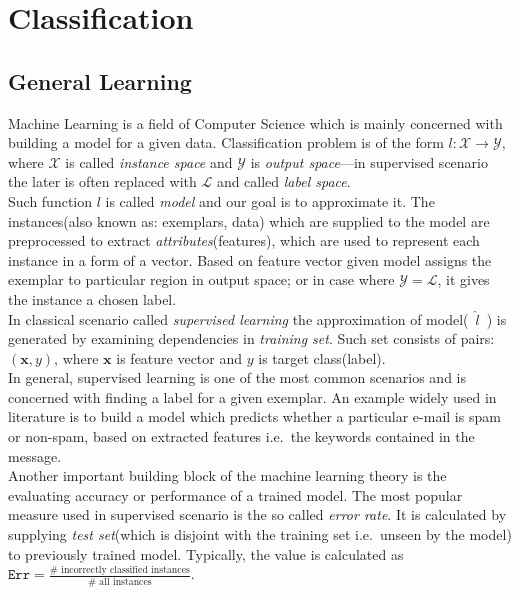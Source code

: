 \documentclass[12pt, a4paper, pdflatex, leqno, twoside]{report}
\begin{document}
\section{Classification}
\subsection{General Learning}
Machine Learning is a field of Computer Science which is mainly concerned with 
building a model for a given data. Classification problem is of the form 
$\mathit{l} : \mathscr{X} \rightarrow \mathscr{Y}$, where $\mathscr{X}$ is 
called \emph{instance space} and $\mathscr{Y}$ is \emph{output space}---in 
supervised scenario the later is often replaced with $\mathscr{L}$ and called \emph{label 
space}.\\
Such function $\mathit{l}$ is called \emph{model} and our goal is to approximate it. 
The instances(also known as: exemplars, data) which are supplied to the model are preprocessed to extract 
\emph{attributes}(features), which are used to represent each instance in a form of a vector. Based on feature vector given model assigns the exemplar to 
particular region in output space; or in case where $\mathscr{Y} = \mathscr{L}$, it 
gives the instance a chosen label.\\

In classical scenario called \emph{supervised learning} the approximation of 
model(~$\mathit{\hat{l}}$~) is generated by examining dependencies in \emph{training set}. Such set consists of pairs: $(\mathit{\mathbf{x}}, \mathit{y})$, where $\mathit{\mathbf{x}}$ is feature vector and $\mathit{y}$ is target class(label).\\
In general, supervised learning is one of the most common scenarios and is 
concerned with finding a label for a given exemplar. An example widely used in literature 
is to build a model which predicts whether a particular e-mail is spam or non-spam, based on extracted features i.e.\ the keywords contained in the message.\\

Another important building block of the machine learning theory is the 
evaluating accuracy or performance of a trained model. The most popular measure used in
supervised scenario is the so called \emph{error rate}. It is 
calculated by supplying \emph{test set}(which is disjoint with the training set i.e.\ unseen by the model) to previously trained model. Typically, the value is calculated as $\mathtt{Err} = 
\frac{\text{$\#$ incorrectly classified instances}}{\text{$\#$ all instances}}$.\\
\end{document}
